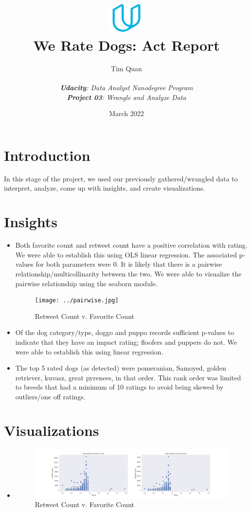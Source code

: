 \documentclass[10pt,a4paper]{article}
\title{\includegraphics[width=2cm]{udacity-logo.png}\\We Rate Dogs: Act Report}
\date{March 2022}
\author{Tim Quan\\ \\ 
	\textit{\textbf{Udacity}: Data Analyst Nanodegree Program}\\ 
	\textit{\textbf{Project 03}: Wrangle and Analyze Data}}
\begin{document}
\maketitle

\section{Introduction}

    In this stage of the project, we used our previously gathered/wrangled data to interpret, analyze, come up with insights,
    and create visualizations.

    \section{Insights}
        \begin{itemize}
            \item Both favorite count and retweet count have a positive correlation with rating. We were able to establish this using OLS linear regression. 
            The associated p-values for both parameters were 0. It is likely that there is a pairwise relationship/multicollinarity between the two. We
            were able to visualize the pairwise relationship using the seaborn module.
            \begin{figure}[h]
                \centering
                \texttt{[image: ../pairwise.jpg]}            
                \caption{Retweet Count v. Favorite Count}
              \end{figure}
            \item Of the dog category/type, doggo and puppo records sufficient p-values to indicate that they have an impact rating; floofers and puppers do not.
            We were able to establish this using linear regression.
            \item The top 5 rated dogs (as detected) were pomeranian, Samoyed, golden retriever, kuvasz, great pyrenees, in that order. This rank order was limited to 
            breeds that had a minimum of 10 ratings to avoid being skewed by outliers/one off ratings.
        \end{itemize}
    \section{Visualizations}
        \begin{itemize}
            \item
                \begin{figure}[h]
                    \centering
                    \includegraphics[width=1\textwidth]{scatter-retweets-favorites.jpg}            
                    \caption{Retweet Count v. Favorite Count}
                \end{figure}

        \end{itemize}
\end{document}

